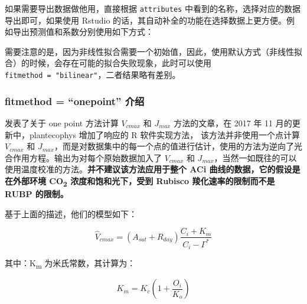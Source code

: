 \documentclass[
]{krantz}
\makeatletter
\newenvironment{Shaded}{\begin{snugshade}}{\end{snugshade}}
\newcommand{\CommentTok}[1]{\textcolor[rgb]{0.56,0.35,0.01}{\textit{#1}}}
\newcommand{\DataTypeTok}[1]{\textcolor[rgb]{0.13,0.29,0.53}{#1}}
\newcommand{\KeywordTok}[1]{\textcolor[rgb]{0.13,0.29,0.53}{\textbf{#1}}}
\newcommand{\NormalTok}[1]{#1}
\newcommand{\OperatorTok}[1]{\textcolor[rgb]{0.81,0.36,0.00}{\textbf{#1}}}
\newcommand{\StringTok}[1]{\textcolor[rgb]{0.31,0.60,0.02}{#1}}
\renewenvironment{quote}{\begin{VF}}{\end{VF}}
\newenvironment{kframe}{%
\medskip{}
\setlength{\fboxsep}{.8em}
 \def\at@end@of@kframe{}%
 \ifinner\ifhmode%
  \def\at@end@of@kframe{\end{minipage}}%
  \begin{minipage}{\columnwidth}%
 \fi\fi%
 \def\FrameCommand##1{\hskip\@totalleftmargin \hskip-\fboxsep
 \colorbox{shadecolor}{##1}\hskip-\fboxsep
     \hskip-\linewidth \hskip-\@totalleftmargin \hskip\columnwidth}%
 \MakeFramed {\advance\hsize-\width
   \@totalleftmargin\z@ \linewidth\hsize
   \@setminipage}}%
 {\par\unskip\endMakeFramed%
 \at@end@of@kframe}
\renewenvironment{Shaded}{\begin{kframe}}{\end{kframe}}
\makeatother
\begin{document}
如果需要导出数据做他用，直接根据 \texttt{attributes} 中看到的名称，选择对应的数据导出即可，如果使用 Rstudio 的话，其自动补全的功能在选择数据上更方便。例如导出预测值和系数分别使用如下方式：

\begin{Shaded}
\end{Shaded}

\begin{quote}
需要注意的是，因为非线性拟合需要一个初始值，因此，使用默认方式（非线性拟合）的时候，会存在可能的拟合失败现象，此时可以使用 \texttt{fitmethod\ =\ "bilinear"}，二者结果略有差别。
\end{quote}

\hypertarget{onepoint}{%
\subsubsection{fitmethod = ``onepoint'' 介绍}\label{onepoint}}

\citet{De2016A} 发表了关于 one point 方法计算 \(V_{cmax}\) 和 \(J_{max}\) 方法的文章，在 2017 年 11 月的更新中，plantecophys 增加了响应的 R 软件实现方法， 该方法并非使用一个点计算 \(V_{cmax}\) 和 \(J_{max}\)，而是对数据集中的每一个点的值进行估计，使用的方法为逆向了光合作用方程。输出为对每个原始数据加入了 \(V_{cmax}\) 和 \(J_{max}\)，当然一如既往的可以使用温度校准的方法。\textbf{并不建议该方法应用于整个 ACi 曲线的数据，它的假设是在外部环境 CO\textsubscript{2} 浓度和饱和光下，受到 Rubisco 羧化速率的限制而不是 RUBP 的限制。}

基于上面的描述，他们的模型如下：

\begin{equation}
\hat{V}_{cmax} = (A_{sat} + R_{day}) \frac{C_i + K_m}{C_i - \Gamma^*} 
\label{eq:inverseA}
\end{equation}

其中：K\textsubscript{m} 为米氏常数，其计算为：

\begin{equation}
K_m = K_c (1 + \frac{O_i}{K_o}) 
\label{eq:km}
\end{equation}
\end{document}
